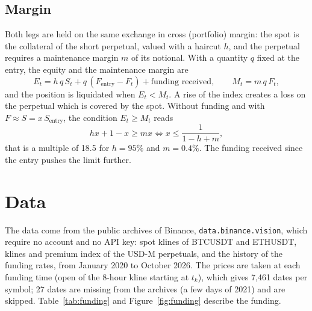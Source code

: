 \documentclass[11pt,a4paper]{article}
\newcommand{\code}[1]{\texttt{#1}}
\begin{document}
\subsection{Margin}
Both legs are held on the same exchange in cross (portfolio) margin: the spot is the collateral of the short
perpetual, valued with a haircut $h$, and the perpetual requires a maintenance margin $m$ of its notional. With a
quantity $q$ fixed at the entry, the equity and the maintenance margin are
\begin{equation}
E_t = h\, q\, S_t + q\,(F_{\mathrm{entry}} - F_t) + \text{funding received}, \qquad M_t = m\, q\, F_t,
\end{equation}
and the position is liquidated when $E_t < M_t$. A rise of the index creates a loss on the perpetual which is covered
by the spot. Without funding and with $F \approx S = x\, S_{\mathrm{entry}}$, the condition $E_t \ge M_t$ reads
\begin{equation}
h x + 1 - x \ge m x \iff x \le \frac{1}{1 - h + m},
\end{equation}
that is a multiple of 18.5 for $h = 95\%$ and $m = 0.4\%$. The funding received since the entry pushes the limit
further.

\section{Data}\label{sec:data}
The data come from the public archives of Binance, \code{data.binance.vision}, which require no account and no API
key: spot klines of BTCUSDT and ETHUSDT, klines and premium index of the USD-M perpetuals, and the history of the
funding rates, from January 2020 to October 2026. The prices are taken at each funding time (open of the 8-hour kline
starting at $t_k$), which gives 7{,}461 dates per symbol; 27 dates are missing from the archives (a few days of 2021)
and are skipped. Table~\ref{tab:funding} and Figure~\ref{fig:funding} describe the funding.
\end{document}
